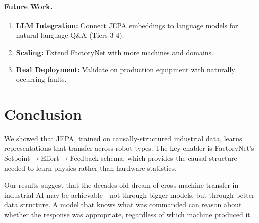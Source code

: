 \documentclass{article}
\begin{document}
\paragraph{Future Work.}
\begin{enumerate}
    \item \textbf{LLM Integration:} Connect JEPA embeddings to language models for natural language Q\&A (Tiers 3-4).
    \item \textbf{Scaling:} Extend FactoryNet with more machines and domains.
    \item \textbf{Real Deployment:} Validate on production equipment with naturally occurring faults.
\end{enumerate}

\section{Conclusion}

We showed that JEPA, trained on causally-structured industrial data, learns representations that transfer across robot types. The key enabler is FactoryNet's Setpoint$\rightarrow$Effort$\rightarrow$Feedback schema, which provides the causal structure needed to learn physics rather than hardware statistics.

Our results suggest that the decades-old dream of cross-machine transfer in industrial AI may be achievable—not through bigger models, but through better data structure. A model that knows what was commanded can reason about whether the response was appropriate, regardless of which machine produced it.
\end{document}
